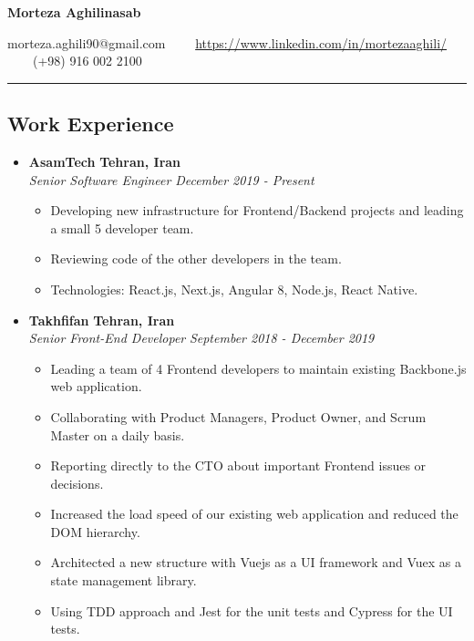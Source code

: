 \documentclass[10pt,letterpaper]{article}
\begin{document}
 
\begin{center}
{\huge \textbf{Morteza Aghilinasab}}

\vspace{1em}

morteza.aghili90@gmail.com \ \ \textbullet \ \  \href{https://www.linkedin.com/in/mortezaaghili/}{https://www.linkedin.com/in/mortezaaghili/}  \ \ \textbullet \ \ (+98) 916 002 2100
\end{center}

\hrule
\vspace{-1.0em}
\subsection*{Work Experience}
  \begin{itemize}
    \item[]
    {\textbf{AsamTech} \hfill
      \textbf{Tehran, Iran}}
    \\
    {\emph{Senior Software Engineer} \hfill \emph{December 2019 - Present}}

    \begin{itemize}[label=\textbullet]
    \itemsep0.5em
    \item Developing new infrastructure for Frontend/Backend projects and leading a small 5 developer team.
    \item Reviewing code of the other developers in the team.
    \item Technologies: React.js, Next.js, Angular 8, Node.js, React Native.
    \end{itemize}
  
    \item[]
    {\textbf{Takhfifan} \hfill
      \textbf{Tehran, Iran}}
    \\
    {\emph{Senior Front-End Developer} \hfill \emph{September 2018 - December 2019}}
    \begin{itemize}[label=\textbullet]
      \itemsep0.5em
      \item Leading a team of 4 Frontend developers to maintain existing Backbone.js web application.
      \item Collaborating with Product Managers, Product Owner, and Scrum Master on a daily basis.
      \item Reporting directly to the CTO about important Frontend issues or decisions.
      \item Increased the load speed of our existing web application and reduced the DOM hierarchy.
      \item Architected a new structure with Vuejs as a UI framework and Vuex as a state management library.
      \item Using TDD approach and Jest for the unit tests and Cypress for the UI tests.
    \end{itemize}
    

\end{itemize}
\end{document}
